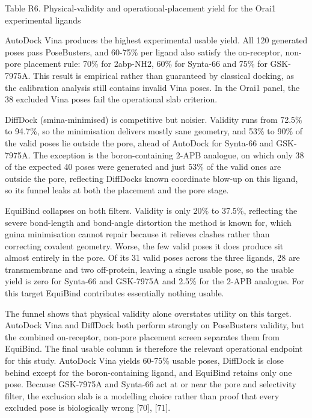 Table R6. Physical-validity and operational-placement yield for the Orai1 experimental ligands

AutoDock Vina produces the highest experimental usable yield. All 120 generated poses pass PoseBusters, and 60-75\% per ligand also satisfy the on-receptor, non-pore placement rule: 70\% for 2abp-NH2, 60\% for Synta-66 and 75\% for GSK-7975A. This result is empirical rather than guaranteed by classical docking, as the calibration analysis still contains invalid Vina poses. In the Orai1 panel, the 38 excluded Vina poses fail the operational slab criterion.

DiffDock (smina-minimised) is competitive but noisier. Validity runs from 72.5\% to 94.7\%, so the minimisation delivers mostly sane geometry, and 53\% to 90\% of the valid poses lie outside the pore, ahead of AutoDock for Synta-66 and GSK-7975A. The exception is the boron-containing 2-APB analogue, on which only 38 of the expected 40 poses were generated and just 53\% of the valid ones are outside the pore, reflecting DiffDock\textquotesingle s known coordinate blow-up on this ligand, so its funnel leaks at both the placement and the pore stage.

EquiBind collapses on both filters. Validity is only 20\% to 37.5\%, reflecting the severe bond-length and bond-angle distortion the method is known for, which gnina minimisation cannot repair because it relieves clashes rather than correcting covalent geometry. Worse, the few valid poses it does produce sit almost entirely in the pore. Of its 31 valid poses across the three ligands, 28 are transmembrane and two off-protein, leaving a single usable pose, so the usable yield is zero for Synta-66 and GSK-7975A and 2.5\% for the 2-APB analogue. For this target EquiBind contributes essentially nothing usable.

The funnel shows that physical validity alone overstates utility on this target. AutoDock Vina and DiffDock both perform strongly on PoseBusters validity, but the combined on-receptor, non-pore placement screen separates them from EquiBind. The final usable column is therefore the relevant operational endpoint for this study. AutoDock Vina yields 60-75\% usable poses, DiffDock is close behind except for the boron-containing ligand, and EquiBind retains only one pose. Because GSK-7975A and Synta-66 act at or near the pore and selectivity filter, the exclusion slab is a modelling choice rather than proof that every excluded pose is biologically wrong {[}70{]}, {[}71{]}.

